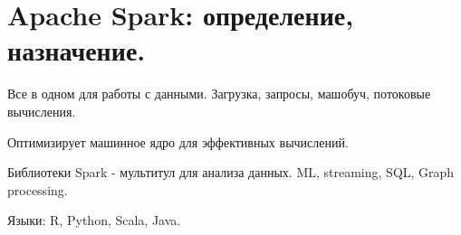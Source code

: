 \section{Apache Spark: определение, назначение.}


Все в одном для работы с данными. Загрузка, запросы,
машобуч, потоковые вычисления.

Оптимизирует машинное ядро для эффективных вычислений.

Библиотеки Spark - мультитул для анализа данных.
ML, streaming, SQL, Graph processing.

Языки: R, Python, Scala, Java.
